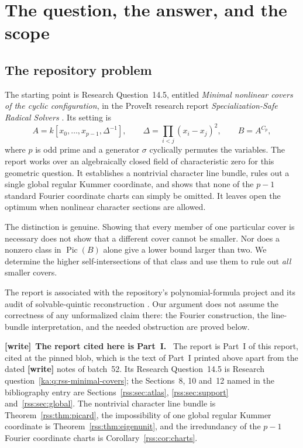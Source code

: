 \documentclass[11pt,a4paper]{article}
\theoremstyle{definition}
\theoremstyle{remark}
\newcommand{\Pic}{\operatorname{Pic}}
\newenvironment{writenote}[1][]{\par\smallskip\begingroup\small
 \noindent\textbf{[write]}\if\relax\detokenize{#1}\relax\else~\textbf{#1.}\fi\ }%
 {\par\endgroup\smallskip}
\begin{document}
\section{The question, the answer, and the scope}
\label{ka:sec:introduction}

\subsection{The repository problem}
The starting point is Research Question~14.5, entitled
\emph{Minimal nonlinear covers of the cyclic configuration}, in the
ProveIt research report \emph{Specialization-Safe Radical Solvers}
\cite{ka:ProveItReport}. Its setting is
\begin{equation}
 A=k[x_0,\ldots,x_{p-1},\Delta^{-1}],\qquad
 \Delta=\prod_{i<j}(x_i-x_j)^2,\qquad B=A^{C_p},
 \label{ka:eq:original}
\end{equation}
where $p$ is odd prime and a generator $\sigma$ cyclically permutes the
variables. The report works over an algebraically closed field of
characteristic zero for this geometric question. It establishes a
nontrivial character line bundle, rules out a single global regular
Kummer coordinate, and shows that none of the $p-1$ standard Fourier
coordinate charts can simply be omitted. It leaves open the optimum
when nonlinear character sections are allowed.

The distinction is genuine. Showing that every member of one particular
cover is necessary does not show that a different cover cannot be
smaller. Nor does a nonzero class in $\Pic(B)$ alone give a lower bound
larger than two. We determine the higher self-intersections of that class
and use them to rule out \emph{all} smaller covers.

The report is associated with the repository's polynomial-formula
project and its audit of solvable-quintic reconstruction
\cite{ka:ProveItLazard}. Our argument does not assume the correctness of any
unformalized claim there: the Fourier construction, the line-bundle
interpretation, and the needed obstruction are proved below.

\begin{writenote}[The report cited here is Part~I]
The report \cite{ka:ProveItReport} is Part~I of this report, cited at the
pinned blob, which is the text of Part~I printed above apart from the dated
\textbf{[write]} notes of batch~52. Its Research Question~14.5 is Research
question~\ref{ka:q:rss-minimal-covers}; the Sections~8, 10 and~12 named in
the bibliography entry are Sections~\ref{rss:sec:atlas},
\ref{rss:sec:support} and~\ref{rss:sec:global}. The nontrivial character
line bundle is Theorem~\ref{rss:thm:picard}, the impossibility of one global
regular Kummer coordinate is Theorem~\ref{rss:thm:eigenunit}, and the
irredundancy of the $p-1$ Fourier coordinate charts is
Corollary~\ref{rss:cor:charts}.
\end{writenote}
\end{document}
